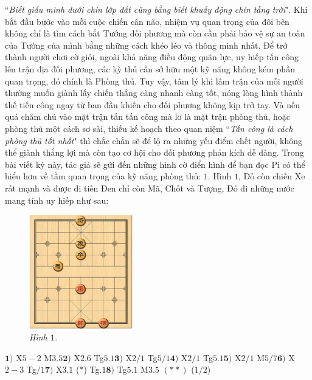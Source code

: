 \vspace*{185pt}
\begin{multicols}{2}
	``\textit{Biết giấu mình dưới chín lớp đất cũng bằng biết khuấy động chín tầng trời}". Khi bắt đầu bước vào mỗi cuộc chiến cân não, nhiệm vụ quan trọng của đôi bên không chỉ là tìm cách bắt Tướng đối phương mà còn cần phải bảo vệ sự an toàn của Tướng của mình bằng những cách khéo léo và thông minh nhất. Để trở thành người chơi cờ giỏi, ngoài khả năng điều động quân lực, uy hiếp tấn công lên trận địa đối phương, các kỳ thủ cần sở hữu một kỹ năng không kém phần quan trọng, đó chính là Phòng thủ.
	\vskip 0.1cm
	Tuy vậy, tâm lý khi lâm trận của mỗi người thường muốn giành lấy chiến thắng càng nhanh càng tốt, nóng lòng hình thành thế tiến công ngay từ ban đầu khiến cho đối phương không kịp trở tay. Và nếu quá chăm chú vào mặt trận tấn tấn công mà lơ là mặt trận phòng thủ, hoặc phòng thủ một cách sơ sài, thiếu kế hoạch theo quan niệm ``\textit{Tấn công là cách phòng thủ tốt nhất}" thì chắc chắn sẽ để lộ ra những yếu điểm chết người, không thể giành thắng lợi mà còn tạo cơ hội cho đối phương phản kích dễ dàng.
	\vskip 0.1cm
	Trong bài viết kỳ này, tác giả sẽ gửi đến những hình cờ điển hình để bạn đọc Pi có thể hiểu hơn về tầm quan trọng của kỹ năng phòng thủ: 
	\vskip 0.1cm
	$1$.	Hình $1$, Đỏ còn chiến Xe rất mạnh và được đi tiên Đen chỉ còn Mã, Chốt và Tượng, Đỏ đi những nước mang tính uy hiếp như sau:  
	\begin{figure}[H]
		\vspace*{-5pt}
		\centering
		\captionsetup{labelformat= empty, justification=centering}
		\includegraphics[width= 0.4\textwidth]{1}
		\caption{\small\textit{\color{gocco}Hình $1$.}}
		\vspace*{-10pt}
	\end{figure}
	$\pmb{1)}$	X$5-2$ M$3.5$\quad $\pmb{2)}$ X$2.6$ Tg$5.1$\quad $\pmb{3)}$ X$2/1$ Tg$5/1$\quad $\pmb{4)}$ X$2/1$ Tg$5.1$\quad $\pmb{5)}$ X$2/1$ M$5/7$\quad $\pmb{6)}$ X$2-3$ Tg$/1$\quad $\pmb{7)}$ X$3.1$ ($*$) Tg$.1$\quad $\pmb{8)}$ Tg$5.1$ M$3.5$ $(**)$  ($1/2$)

\end{multicols}
